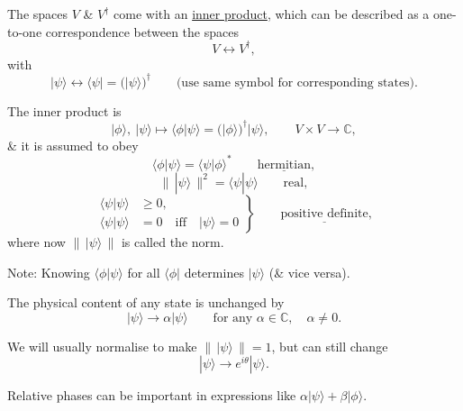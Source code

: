 \documentclass[11pt,a4paper]{article}
\begin{document}
The spaces $V$ \& $V^\dagger$ come with an
\underline{inner product}, which can be described as a one-to-one
correspondence between the spaces
\[
    V\longleftrightarrow V^\dagger,
\]
with
\[
    |\psi\rangle
    \longleftrightarrow
    \langle\psi|
    =
    \bigl(|\psi\rangle\bigr)^\dagger
    \qquad
    \text{(use same symbol for corresponding states).}
\]

The inner product is
\[
    |\phi\rangle,\ |\psi\rangle
    \longmapsto
    \langle\phi|\psi\rangle
    =
    \bigl(|\phi\rangle\bigr)^\dagger|\psi\rangle,
    \qquad
    V\times V\to\mathbb{C},
\]
\& it is assumed to obey
\[
    \langle\phi|\psi\rangle
    =
    \langle\psi|\phi\rangle^*
    \qquad
    \underline{\text{hermitian}},
\]
\[
    \bigl\|\,|\psi\rangle\,\bigr\|^2
    =
    \langle\psi|\psi\rangle
    \qquad
    \text{real},
\]
\[
    \left.
    \begin{aligned}
        \langle\psi|\psi\rangle &\geq 0,\\
        \langle\psi|\psi\rangle &=0
        \quad\text{iff}\quad
        |\psi\rangle=0
    \end{aligned}
    \right\}
    \qquad
    \underline{\text{positive definite}},
\]
where now $\bigl\|\,|\psi\rangle\,\bigr\|$ is called the norm.

\medskip

\noindent
Note: Knowing $\langle\phi|\psi\rangle$ for all
$\langle\phi|$ determines $|\psi\rangle$
(\& vice versa).

\medskip

\noindent
[Check:
\[
    \langle\phi|\psi_1\rangle
    =
    \langle\phi|\psi_2\rangle
    \quad\Rightarrow\quad
    \langle\phi|\chi\rangle=0,
    \qquad
    \text{where }
    |\chi\rangle=|\psi_1\rangle-|\psi_2\rangle.
\]
If this holds $\forall\,\langle\phi|$, set
$\langle\phi|=\langle\chi|$ \& get
\[
    \langle\chi|\chi\rangle
    =
    \bigl\|\,|\chi\rangle\,\bigr\|^2
    =
    0
    \quad\Rightarrow\quad
    |\chi\rangle=0,
    \qquad
    \text{as claimed.}
\]
]

\medskip

The physical content of any state is unchanged by
\[
    |\psi\rangle\to\alpha|\psi\rangle
    \qquad
    \text{for any }\alpha\in\mathbb{C},\quad\alpha\neq0.
\]

We will usually normalise to make
$\bigl\|\,|\psi\rangle\,\bigr\|=1$, but can still change
\[
    |\psi\rangle\to e^{i\theta}|\psi\rangle.
\]

Relative phases can be important in expressions like
$\alpha|\psi\rangle+\beta|\phi\rangle$.
\end{document}
